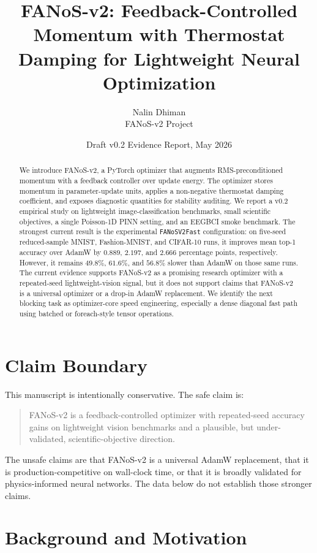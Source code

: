 \documentclass[11pt]{article}
\title{FANoS-v2: Feedback-Controlled Momentum with Thermostat Damping for Lightweight Neural Optimization}
\author{Nalin Dhiman\\FANoS-v2 Project}
\date{Draft v0.2 Evidence Report, May 2026}
\begin{document}
\maketitle

\begin{abstract}
We introduce FANoS-v2, a PyTorch optimizer that augments RMS-preconditioned momentum with a feedback controller over update energy. The optimizer stores momentum in parameter-update units, applies a non-negative thermostat damping coefficient, and exposes diagnostic quantities for stability auditing. We report a v0.2 empirical study on lightweight image-classification benchmarks, small scientific objectives, a single Poisson-1D PINN setting, and an EEGBCI smoke benchmark. The strongest current result is the experimental \texttt{FANoSV2Fast} configuration: on five-seed reduced-sample MNIST, Fashion-MNIST, and CIFAR-10 runs, it improves mean top-1 accuracy over AdamW by $0.889$, $2.197$, and $2.666$ percentage points, respectively. However, it remains $49.8\%$, $61.6\%$, and $56.8\%$ slower than AdamW on those same runs. The current evidence supports FANoS-v2 as a promising research optimizer with a repeated-seed lightweight-vision signal, but it does not support claims that FANoS-v2 is a universal optimizer or a drop-in AdamW replacement. We identify the next blocking task as optimizer-core speed engineering, especially a dense diagonal fast path using batched or foreach-style tensor operations.
\end{abstract}

\section{Claim Boundary}

This manuscript is intentionally conservative. The safe claim is:
\begin{quote}
FANoS-v2 is a feedback-controlled optimizer with repeated-seed accuracy gains on lightweight vision benchmarks and a plausible, but under-validated, scientific-objective direction.
\end{quote}
The unsafe claims are that FANoS-v2 is a universal AdamW replacement, that it is production-competitive on wall-clock time, or that it is broadly validated for physics-informed neural networks. The data below do not establish those stronger claims.

\section{Background and Motivation}
\end{document}
